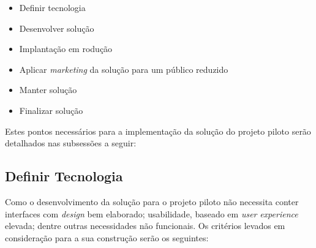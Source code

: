 \begin{itemize}
    \item Definir tecnologia
    \item Desenvolver solução
    \item Implantação em rodução
    \item Aplicar \textit{marketing} da solução para um público reduzido
    \item Manter solução
    \item Finalizar solução
\end{itemize}

Estes pontos necessários para a implementação da solução do projeto piloto serão detalhados 
nas subsessões a seguir:

\subsection{Definir Tecnologia}
\label{sub:definir_tecnologia}
Como o desenvolvimento da solução para o projeto piloto não necessita conter interfaces com \textit{design} bem elaborado;
usabilidade, baseado em \textit{user} \textit{experience} elevada; dentre outras necessidades não funcionais. Os critérios levados em
consideração para a sua construção serão os seguintes:

